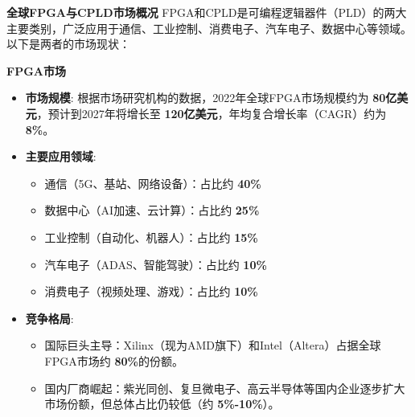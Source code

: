 \documentclass[
  ignorenonframetext,
  chinese,
]{beamer}
\providecommand{\tightlist}{%
  \setlength{\itemsep}{0pt}\setlength{\parskip}{0pt}}
\begin{document}
\begin{frame}{\textbf{全球FPGA与CPLD市场概况}}
\label{ux5168ux7403fpgaux4e0ecpldux5e02ux573aux6982ux51b5}
FPGA和CPLD是可编程逻辑器件（PLD）的两大主要类别，广泛应用于通信、工业控制、消费电子、汽车电子、数据中心等领域。以下是两者的市场现状：

\begin{block}{\textbf{FPGA市场}}
\label{fpgaux5e02ux573a}
\begin{itemize}
\tightlist
\item
  \textbf{市场规模}: 根据市场研究机构的数据，2022年全球FPGA市场规模约为
  \textbf{80亿美元}，预计到2027年将增长至
  \textbf{120亿美元}，年均复合增长率（CAGR）约为 \textbf{8\%}。
\item
  \textbf{主要应用领域}:

  \begin{itemize}
  \tightlist
  \item
    通信（5G、基站、网络设备）：占比约 \textbf{40\%}\\
  \item
    数据中心（AI加速、云计算）：占比约 \textbf{25\%}\\
  \item
    工业控制（自动化、机器人）：占比约 \textbf{15\%}\\
  \item
    汽车电子（ADAS、智能驾驶）：占比约 \textbf{10\%}\\
  \item
    消费电子（视频处理、游戏）：占比约 \textbf{10\%}\\
  \end{itemize}
\item
  \textbf{竞争格局}:

  \begin{itemize}
  \tightlist
  \item
    国际巨头主导：Xilinx（现为AMD旗下）和Intel（Altera）占据全球FPGA市场约
    \textbf{80\%}的份额。\\
  \item
    国内厂商崛起：紫光同创、复旦微电子、高云半导体等国内企业逐步扩大市场份额，但总体占比仍较低（约
    \textbf{5\%-10\%}）。
  \end{itemize}
\end{itemize}
\end{block}
\end{frame}
\end{document}
